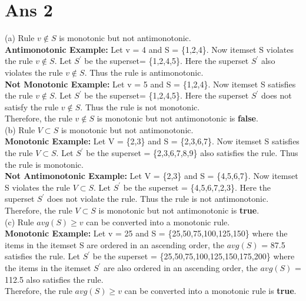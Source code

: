 \documentclass[10pt]{article}
\begin{document}
\section*{Ans 2}
\begin{flushleft}
(a) Rule $v \notin S$ is monotonic but not antimonotonic. \\
\textbf{Antimonotonic Example:} Let v = 4 and S = \{1,2,4\}. Now itemset S violates the rule $v \notin S$. Let $S^{'}$ be the superset= \{1,2,4,5\}. Here the superset $S^{'}$ also violates the rule $v \notin S$. Thus the rule is antimonotonic.\\
\vspace{0.5em}
\textbf{Not Monotonic Example:} Let v = 5 and S = \{1,2,4\}. Now itemset S satisfies the rule $v \notin S$. Let $S^{'}$ be the superset= \{1,2,4,5\}. Here the superset $S^{'}$ does not satisfy the rule $v \notin S$. Thus the rule is not monotonic.\\
\vspace{0.5em}
Therefore, the rule $v \notin S$ is monotonic but not antimonotonic is \textbf{false}.\\
\vspace{1em}
(b) Rule $V \subset S$ is monotonic but not antimonotonic.\\
\textbf{Monotonic Example:} Let V = \{2,3\} and S = \{2,3,6,7\}. Now itemset S satisfies the rule $V \subset S$. Let $S^{'}$ be the superset = \{2,3,6,7,8,9\} also satisfies the rule. Thus the rule is monotonic.\\
\vspace{0.5em}
\textbf{Not Antimonotonic Example:} Let V = \{2,3\} and S = \{4,5,6,7\}. Now itemset S violates the rule $V \subset S$. Let $S^{'}$ be the superset = \{4,5,6,7,2,3\}. Here the superset $S^{'}$ does not violate the rule. Thus the rule is not antimonotonic.\\
\vspace{0.5em}
Therefore, the rule $V \subset S$ is monotonic but not antimonotonic is \textbf{true}.\\
\vspace{1em}
(c) Rule $avg(S) \geq v$ can be converted into a monotonic rule.\\
\textbf{Monotonic Example:} Let v = 25 and S = \{25,50,75,100,125,150\} where the items in the itemset S are ordered in an ascending order, the $avg(S)$ = 87.5 satisfies the rule. Let $S^{'}$ be the superset = \{25,50,75,100,125,150,175,200\} where the items in the itemset $S^{'}$ are also ordered in an ascending order, the $avg(S)$ = 112.5 also satisfies the rule.\\
\vspace{0.5em}
Therefore, the rule $avg(S) \geq v$ can be converted into a monotonic rule is \textbf{true}.\\
\end{flushleft}
\end{document}
